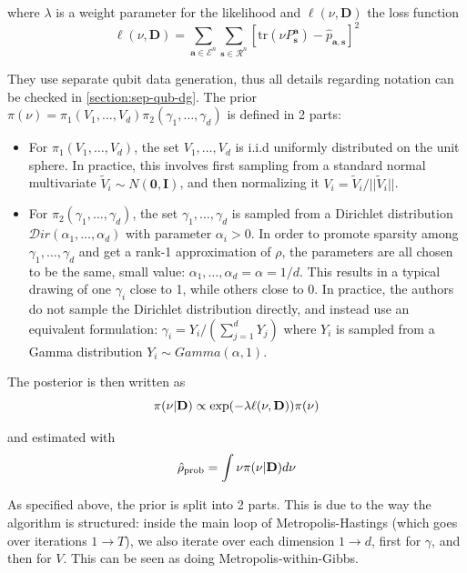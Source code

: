\documentclass[12pt]{memoir}
\newcommand{\tr}{\text{tr}}
\newcommand{\mb}{\mathbf}
\newcommand{\tb}{\textbf}
\begin{document}
where $\lambda$ is a weight parameter for the likelihood and $\ell(\nu, \mb D)$ the loss function
\begin{equation}
    \ell(\nu, \mb D) = \sum_{\mb a \in \mathcal{E}^n} \sum_{\mb s \in \mathcal{R}^n} \left[\tr(\nu P^{\mb a}_{\mb s}) - \hat p_{\mb a,\mb s}\right]^2
\end{equation}\medbreak

They use separate qubit data generation, thus all details regarding notation can be checked in \ref{section:sep-qub-dg}. The prior $\pi(\nu) = \pi_1(V_1, \dots, V_d) \pi_2(\gamma_1, \dots, \gamma_d)$ is defined in 2 parts:

\begin{itemize}
    \item For $\pi_1(V_1, \dots, V_d)$, the set $V_1, \dots, V_d$ is i.i.d uniformly distributed on the unit sphere. In practice, this involves first sampling from a standard normal multivariate $\tilde V_i \sim N(\mb 0, \mb I)$, and then normalizing it $V_i = \tilde V_i/||\tilde V_i||$.
    \item For $\pi_2(\gamma_1, \dots, \gamma_d)$, the set $\gamma_1,\dots,\gamma_d$ is sampled from a Dirichlet distribution $\mathcal{D}ir(\alpha_1,\dots,\alpha_d)$ with parameter $\alpha_i > 0$. In order to promote sparsity among $\gamma_1, \dots, \gamma_d$ and get a rank-1 approximation of $\rho$, the parameters are all chosen to be the same, small value: $\alpha_1,\dots,\alpha_d = \alpha = 1/d$. This results in a typical drawing of one $\gamma_i$ close to 1, while others close to 0. In practice, the authors do not sample the Dirichlet distribution directly, and instead use an equivalent formulation: $\gamma_i = Y_i/(\sum_{j=1}^{d} Y_j)$ where $Y_i$ is sampled from a Gamma distribution $Y_i \sim Gamma(\alpha, 1)$.  

\end{itemize}

The posterior is then written as
\begin{equation}
    \pi(\nu|\tb D) \propto \exp(-\lambda\ell(\nu, \mb D)) \pi(\nu)
\end{equation}

and estimated with
\begin{equation}
    \hat \rho_{\text{prob}} = \int \nu \pi(\nu|\tb D) d\nu
\end{equation}


As specified above, the prior is split into 2 parts. This is due to the way the algorithm is structured: inside the main loop of Metropolis-Hastings (which goes over iterations $1\rightarrow T$), we also iterate over each dimension $1\rightarrow d$, first for $\gamma$, and then for $V$. This can be seen as doing Metropolis-within-Gibbs. \medbreak
\end{document}
